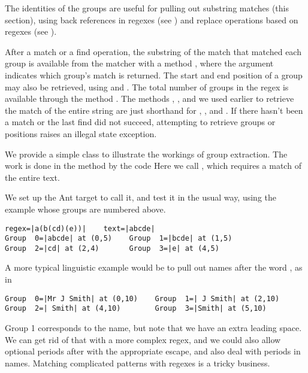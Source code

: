 The identities of the groups are useful for pulling out substring
matches (this section), using back references in regexes (see
) and replace operations based on regexes (see
). 

After a match or a find operation, the substring of the match that
matched each group is available from the matcher with a method
, where the argument indicates which group's match
is returned.  The start and end position of a group may also be
retrieved, using  and .  The total
number of groups in the regex is available through the method
.  The methods
, , and  we used earlier to
retrieve the match of the entire string are just shorthand for
, , and .  If there hasn't
been a match or the last find did not succeed, attempting to retrieve
groups or positions raises an illegal state exception.

We provide a simple class  to illustrate the workings
of group extraction.  The work is done in the  method
by the code
%
%
Here we call , which requires a match of the
entire text.  

We set up the Ant target  to call it, and test
it in the usual way, using the example whose groups are numbered
above.
%
\begin{verbatim}
regex=|a(b(cd)(e))|    text=|abcde|
Group  0=|abcde| at (0,5)    Group  1=|bcde| at (1,5)
Group  2=|cd| at (2,4)       Group  3=|e| at (4,5)
\end{verbatim}
%
A more typical linguistic example would be to pull out names
after the word , as in
%
\begin{verbatim}
Group  0=|Mr J Smith| at (0,10)    Group  1=| J Smith| at (2,10)
Group  2=| Smith| at (4,10)        Group  3=|Smith| at (5,10)
\end{verbatim}
%
Group 1 corresponds to the name, but note that we have an extra
leading space.  We can get rid of that with a more complex regex, and
we could also allow optional periods after  with the
appropriate escape, and also deal with periods in names.  Matching
complicated patterns with regexes is a tricky business.

